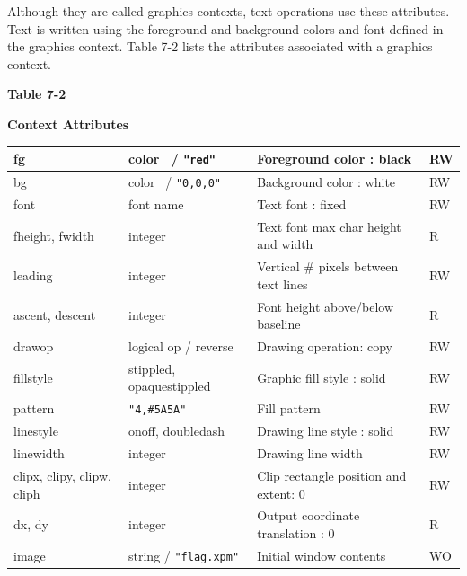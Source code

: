 Although they are called graphics contexts, text operations use these
attributes. Text is written using the foreground and background colors
and font defined in the graphics context. Table 7-2 lists the
attributes associated with a graphics context.

{\centering\sffamily\bfseries
Table 7-2
\par}

{\centering\sffamily\bfseries
Context Attributes
\par}

\begin{center}
\begin{supertabular}{|m{1.076in}|m{1.5in}|m{2.58in}|m{0.448in}|}
fg &
color \ / \texttt{"red"} &
Foreground color : black &
RW\\\hline
bg &
color \ / \texttt{"0,0,0"} &
Background color : white &
RW\\\hline
font &
font name &
Text font : fixed &
RW\\\hline
fheight, fwidth &
integer &
Text font max char height and width &
R\\\hline
leading &
integer &
Vertical \# pixels between text lines &
RW\\\hline
ascent, descent &
integer &
Font height above/below baseline &
R\\\hline
drawop &
logical op / reverse  &
Drawing operation: copy &
RW\\\hline
fillstyle &
stippled, opaquestippled &
Graphic fill style : solid &
RW\\\hline
pattern &
\texttt{"4,\#5A5A"} &
Fill pattern &
RW\\\hline
linestyle &
onoff, doubledash &
Drawing line style : solid  &
RW\\\hline
linewidth &
integer &
Drawing line width &
RW\\\hline
clipx, clipy, clipw, cliph &
integer &
Clip rectangle position and extent: 0 &
RW\\\hline
dx, dy &
integer &
Output coordinate translation : 0 &
R\\\hline
image &
string / \texttt{"flag.xpm"} &
Initial window contents &
WO\\\hline
\end{supertabular}
\end{center}

